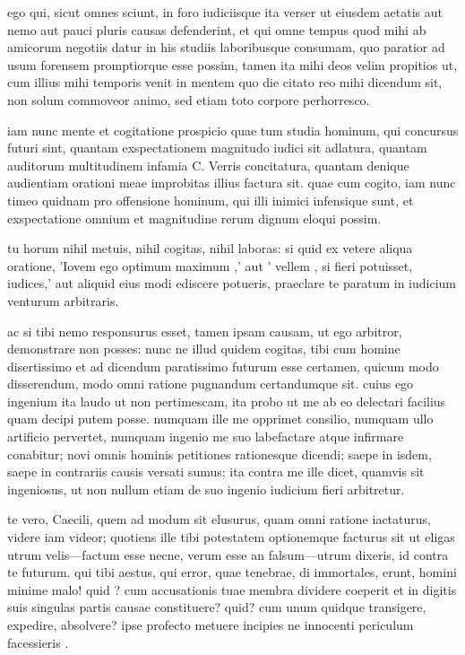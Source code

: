  ego qui, sicut omnes sciunt, in foro iudiciisque ita verser ut eiusdem aetatis aut nemo aut pauci pluris causas defenderint, et qui omne tempus quod mihi ab amicorum negotiis datur in his studiis laboribusque consumam, quo paratior ad usum forensem promptiorque esse possim, tamen ita mihi deos velim propitios ut, cum illius mihi temporis venit in mentem quo die citato reo mihi dicendum sit, non solum commoveor animo, sed etiam toto corpore perhorresco.

 iam nunc mente et cogitatione prospicio quae tum studia hominum, qui concursus futuri sint, quantam exspectationem magnitudo iudici sit adlatura, quantam auditorum multitudinem infamia C. Verris concitatura, quantam denique audientiam orationi meae improbitas illius factura sit. quae cum cogito, iam nunc timeo quidnam pro offensione hominum, qui illi inimici infensique sunt, et exspectatione omnium et magnitudine rerum dignum eloqui possim.

 tu horum nihil metuis, nihil cogitas, nihil laboras: si quid ex vetere aliqua oratione, 'Iovem ego optimum maximum ,' aut ' vellem , si fieri potuisset, iudices,' aut aliquid eius modi ediscere potueris, praeclare te paratum in iudicium venturum arbitraris.

 ac si tibi nemo responsurus esset, tamen ipsam causam, ut ego arbitror, demonstrare non posses: nunc ne illud quidem cogitas, tibi cum homine disertissimo et ad dicendum paratissimo futurum esse certamen, quicum modo disserendum, modo omni ratione pugnandum certandumque sit. cuius ego ingenium ita laudo ut non pertimescam, ita probo ut me ab eo delectari facilius quam decipi putem posse. numquam ille me opprimet consilio, numquam ullo artificio pervertet, numquam ingenio me suo labefactare atque infirmare conabitur; novi omnis hominis petitiones rationesque dicendi; saepe in isdem, saepe in contrariis causis versati sumus; ita contra me ille dicet, quamvis sit ingeniosus, ut non nullum etiam de suo ingenio iudicium fieri arbitretur.

 te vero, Caecili, quem ad modum sit elusurus, quam omni ratione iactaturus, videre iam videor; quotiens ille tibi potestatem optionemque facturus sit ut eligas utrum velis—factum esse necne, verum esse an falsum—utrum dixeris, id contra te futurum. qui tibi aestus, qui error, quae tenebrae, di immortales, erunt, homini minime malo! quid ? cum accusationis tuae membra dividere coeperit et in digitis suis singulas partis causae constituere? quid? cum unum quidque transigere, expedire, absolvere? ipse profecto metuere incipies ne innocenti periculum facessieris .

